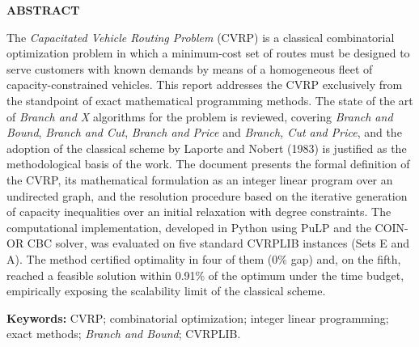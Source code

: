 \clearpage
\thispagestyle{empty}
\begin{center}
    \bfseries\fontsize{14}{16}\selectfont ABSTRACT
\end{center}
\vspace{16pt}

\noindent
The \textit{Capacitated Vehicle Routing Problem} (CVRP) is a classical combinatorial
optimization problem in which a minimum-cost set of routes must be designed to serve
customers with known demands by means of a homogeneous fleet of capacity-constrained
vehicles. This report addresses the CVRP exclusively from the standpoint of
exact mathematical programming methods. The state of the art of \textit{Branch and X}
algorithms for the problem is reviewed, covering \textit{Branch and Bound},
\textit{Branch and Cut}, \textit{Branch and Price} and \textit{Branch, Cut and Price},
and the adoption of the classical scheme by Laporte and Nobert (1983) is justified as
the methodological basis of the work. The document presents the formal definition of
the CVRP, its mathematical formulation as an integer linear program over an undirected
graph, and the resolution procedure based on the iterative generation of
capacity inequalities over an initial relaxation with degree constraints. The computational implementation, developed in Python using PuLP and the
COIN-OR CBC solver, was evaluated on five standard CVRPLIB instances (Sets E
and A). The method certified optimality in four of them (0\% gap) and, on the
fifth, reached a feasible solution within 0.91\% of the optimum under the time
budget, empirically exposing the scalability limit of the classical scheme.

\vspace{10pt}
\noindent\textbf{Keywords:} CVRP; combinatorial optimization; integer linear
programming; exact methods; \textit{Branch and Bound}; CVRPLIB.
